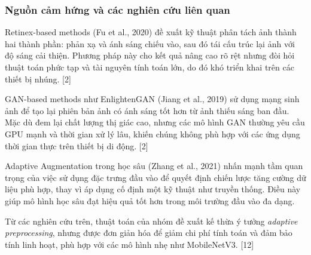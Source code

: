 \subsubsection{Nguồn cảm hứng và các nghiên cứu liên quan} %

Retinex-based methods (Fu et al., 2020) đề xuất kỹ thuật phân tách ảnh thành hai thành phần: phản xạ và ánh sáng chiếu vào, sau đó tái cấu trúc lại ảnh với độ sáng cải thiện. Phương pháp này cho kết quả nâng cao rõ rệt nhưng đòi hỏi thuật toán phức tạp và tài nguyên tính toán lớn, do đó khó triển khai trên các thiết bị nhúng. [2]

GAN-based methods như EnlightenGAN (Jiang et al., 2019) sử dụng mạng sinh ảnh để tạo lại phiên bản ảnh có ánh sáng tốt hơn từ ảnh thiếu sáng ban đầu. Mặc dù đem lại chất lượng thị giác cao, nhưng các mô hình GAN thường yêu cầu GPU mạnh và thời gian xử lý lâu, khiến chúng không phù hợp với các ứng dụng thời gian thực trên thiết bị di động. [2]

Adaptive Augmentation trong học sâu (Zhang et al., 2021) nhấn mạnh tầm quan trọng của việc sử dụng đặc trưng đầu vào để quyết định chiến lược tăng cường dữ liệu phù hợp, thay vì áp dụng cố định một kỹ thuật như truyền thống. Điều này giúp mô hình học sâu đạt hiệu quả tốt hơn trong môi trường đầu vào đa dạng.

Từ các nghiên cứu trên, thuật toán của nhóm đề xuất kế thừa ý tưởng \textit{adaptive preprocessing}, nhưng được đơn giản hóa để giảm chi phí tính toán và đảm bảo tính linh hoạt, phù hợp với các mô hình nhẹ như MobileNetV3. [12]
